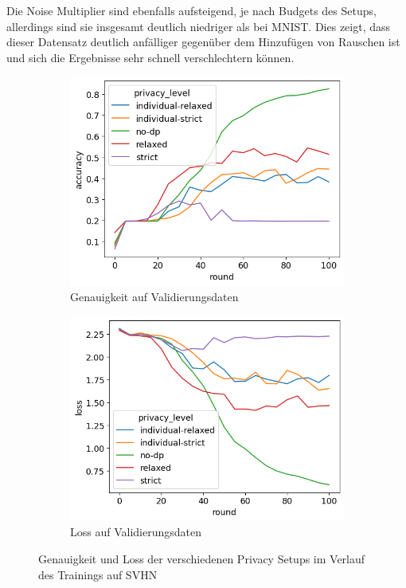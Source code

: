 Die Noise Multiplier sind ebenfalls aufsteigend, je nach Budgets des Setups, allerdings sind sie insgesamt deutlich niedriger als bei MNIST. Dies zeigt, dass dieser Datensatz deutlich anfälliger gegenüber dem Hinzufügen von Rauschen ist und sich die Ergebnisse sehr schnell verschlechtern können.

\begin{figure}
	\centering
	\begin{subfigure}{0.45\textwidth}
		\centering
		\includegraphics[width=\textwidth]{Bilder/svhn-accuracy.png}
		\caption{Genauigkeit auf Validierungsdaten}
	\end{subfigure}
	\begin{subfigure}{0.45\textwidth}
		\centering
		\includegraphics[width=\textwidth]{Bilder/svhn-loss.png}
		\caption{Loss auf Validierungsdaten}
	\end{subfigure}
	\caption{Genauigkeit und Loss der verschiedenen Privacy Setups im Verlauf des Trainings auf SVHN}
	\label{fig:fed-svhn-results}
\end{figure}

